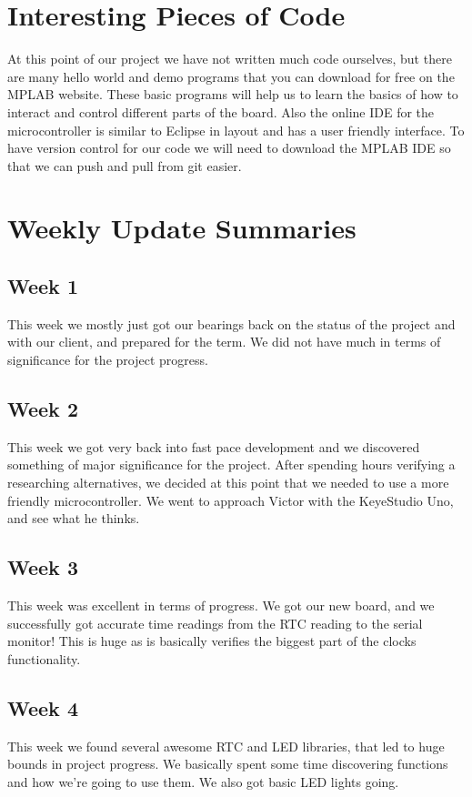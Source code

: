 \documentclass[onecolumn, draftclsnofoot,10pt, compsoc]{IEEEtran}
\begin{document}
\section{Interesting Pieces of Code}
At this point of our project we have not written much code ourselves, but there are many hello world and demo programs that you can download for free on the MPLAB website.
These basic programs will help us to learn the basics of how to interact and control different parts of the board.
Also the online IDE for the microcontroller is similar to Eclipse in layout and has a user friendly interface.
To have version control for our code we will need to download the MPLAB IDE so that we can push and pull from git easier.

\section{Weekly Update Summaries}
\subsection{Week 1}
This week we mostly just got our bearings back on the status of the project and with our client, and prepared for the term.
We did not have much in terms of significance for the project progress.

\subsection{Week 2}
This week we got very back into fast pace development and we discovered something of major significance for the project.
After spending hours verifying a researching alternatives, we decided at this point that we needed to use a more friendly microcontroller.
We went to approach Victor with the KeyeStudio Uno, and see what he thinks.

\subsection{Week 3}
This week was excellent in terms of progress.
We got our new board, and we successfully got accurate time readings from the RTC reading to the serial monitor!
This is huge as is basically verifies the biggest part of the clocks functionality.

\subsection{Week 4}
This week we found several awesome RTC and LED libraries, that led to huge bounds in project progress.
We basically spent some time discovering functions and how we're going to use them.
We also got basic LED lights going.
\end{document}

